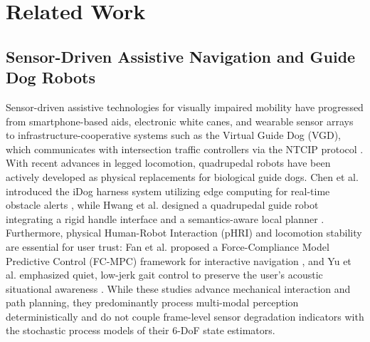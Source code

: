 \documentclass[11pt, a4paper]{article}
\begin{document}
\section{Related Work}
\label{sec:related_work}

\subsection{Sensor-Driven Assistive Navigation and Guide Dog Robots}
Sensor-driven assistive technologies for visually impaired mobility have progressed from smartphone-based aids, electronic white canes, and wearable sensor arrays \cite{patel2024review, wang2026design, ye2016co} to infrastructure-cooperative systems such as the Virtual Guide Dog (VGD), which communicates with intersection traffic controllers via the NTCIP protocol \cite{zhong2020virtual}. With recent advances in legged locomotion, quadrupedal robots have been actively developed as physical replacements for biological guide dogs. Chen et al. introduced the iDog harness system utilizing edge computing for real-time obstacle alerts \cite{chen2024idog}, while Hwang et al. designed a quadrupedal guide robot integrating a rigid handle interface and a semantics-aware local planner \cite{hwang2022system}. Furthermore, physical Human-Robot Interaction (pHRI) and locomotion stability are essential for user trust: Fan et al. proposed a Force-Compliance Model Predictive Control (FC-MPC) framework for interactive navigation \cite{fan2024force}, and Yu et al. emphasized quiet, low-jerk gait control to preserve the user's acoustic situational awareness \cite{yu2025human}. While these studies advance mechanical interaction and path planning, they predominantly process multi-modal perception deterministically and do not couple frame-level sensor degradation indicators with the stochastic process models of their 6-DoF state estimators.
\end{document}
